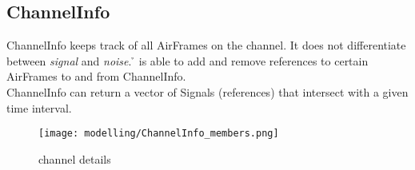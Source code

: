 


\subsection{ChannelInfo}

ChannelInfo keeps track of all AirFrames on the channel. It does not
differentiate between \textit{signal} and \textit{noise}. \h{\bp} is able to
add and remove references to certain AirFrames to and from ChannelInfo.\\
ChannelInfo can return a vector of Signals (references) that intersect with a
given time interval.

\begin{figure}[H]
 \centering
 \texttt{[image: modelling/ChannelInfo\_members.png]}
 \caption{channel details}
 \label{fig: channel details}
\end{figure}

